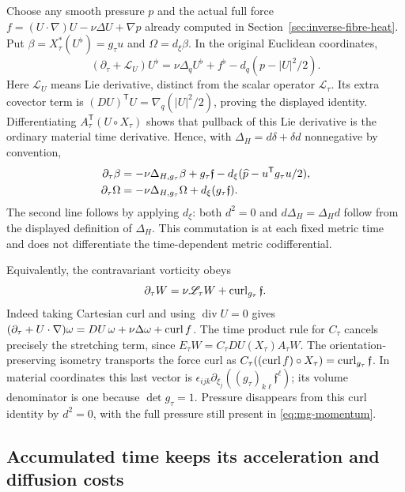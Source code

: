 Choose any smooth pressure $p$ and the actual full force
$f=(U\cdot\nabla)U-\nu\Delta U+\nabla p$ already computed in
Section~\ref{sec:inverse-fibre-heat}. Put
$\beta=X_\tau^*(U^\flat)=g_\tau u$ and $\Omega=d_\xi\beta$.
In the original Euclidean coordinates,
\[
 (\partial_\tau+\mathcal L_U)U^\flat
 =\nu\Delta_qU^\flat+f^\flat-d_q(p-|U|^2/2).
\]
Here $\mathcal L_U$ means Lie derivative, distinct from the scalar
operator $\mathcal L_\tau$. Its extra covector term is
$(DU)^{\mathsf T}U=\nabla_q(|U|^2/2)$, proving the displayed identity.
Differentiating $A_\tau^{\mathsf T}(U\circ X_\tau)$ shows that
pullback of this Lie derivative is the ordinary material time derivative.
Hence, with $\Delta_H=d\delta+\delta d$ nonnegative by convention,
\begin{align}
 \partial_\tau\beta
 &=-\nu\Delta_{H,g_\tau}\beta+g_\tau\mathfrak f
       -d_\xi(\widehat p-u^{\mathsf T}g_\tau u/2),\notag\\
 \partial_\tau\Omega
 &=-\nu\Delta_{H,g_\tau}\Omega+d_\xi(g_\tau\mathfrak f).
 \label{eq:mg-vorticity-form}
\end{align}
The second line follows by applying $d_\xi$: both $d^2=0$ and
$d\Delta_H=\Delta_Hd$ follow from the displayed definition of $\Delta_H$.
This commutation is at each fixed metric time and does not differentiate
the time-dependent metric codifferential.

Equivalently, the contravariant vorticity obeys
\begin{equation}\label{eq:mg-vorticity-vector}
 \partial_\tau W=\nu\mathscr L_\tau W+\operatorname{curl}_{g_\tau}\mathfrak f.
\end{equation}
Indeed taking Cartesian curl and using $\operatorname{div}U=0$ gives
$(\partial_\tau+U\cdot\nabla)\omega
=DU\,\omega+\nu\Delta\omega+\operatorname{curl} f$.
The time product rule for $C_\tau$ cancels precisely the stretching
term, since $E_\tau W=C_\tau DU(X_\tau)A_\tau W$.
The orientation-preserving isometry transports the force curl as
$C_\tau((\operatorname{curl} f)\circ X_\tau)=\operatorname{curl}_{g_\tau}\mathfrak f$.
In material coordinates this last vector is
$\epsilon_{ijk}\partial_{\xi_j}((g_\tau)_{k\ell}\mathfrak f^\ell)$;
its volume denominator is one because $\det g_\tau=1$.
Pressure disappears from this curl identity by $d^2=0$, with the
full pressure still present in \eqref{eq:mg-momentum}.

\subsection{Accumulated time keeps its acceleration and diffusion costs}

